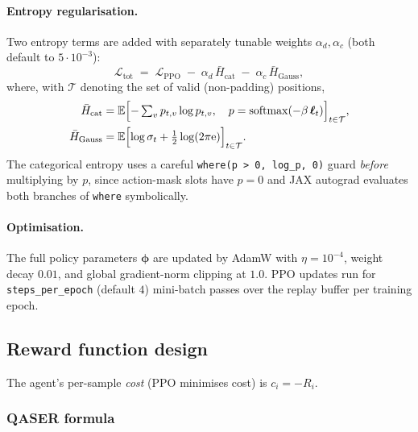 \documentclass[11pt,a4paper]{article}
\newcommand{\Expect}{\mathbb{E}}
\newcommand{\softmax}{\operatorname{softmax}}
\newcommand{\E}{\mathrm{e}}
\begin{document}
\paragraph{Entropy regularisation.}
Two entropy terms are added with separately tunable weights $\alpha_d, \alpha_c$ (both default to $5\!\cdot\!10^{-3}$):
\begin{equation}
\mathcal{L}_{\text{tot}}
\;=\;
\mathcal{L}_{\text{PPO}}
\;-\;
\alpha_d\,\bar{H}_{\text{cat}}
\;-\;
\alpha_c\,\bar{H}_{\text{Gauss}},
\end{equation}
where, with $\mathcal{T}$ denoting the set of valid (non-padding) positions,
\begin{align}
\bar{H}_{\text{cat}}
&= \Expect\Bigl[
-\textstyle\sum_{v} p_{t,v}\log p_{t,v},\quad
p = \softmax(-\beta\,\bm{\ell}_t)
\Bigr]_{t \in \mathcal{T}},\\
\bar{H}_{\text{Gauss}}
&= \Expect\Bigl[
\log\sigma_t + \tfrac{1}{2}\log(2\pi\E)
\Bigr]_{t \in \mathcal{T}}.
\end{align}
The categorical entropy uses a careful \texttt{where(p > 0, log\_p, 0)} guard \emph{before} multiplying by $p$, since action-mask slots have $p=0$ and JAX autograd evaluates both branches of \texttt{where} symbolically.

\paragraph{Optimisation.}
The full policy parameters $\bm{\phi}$ are updated by AdamW with $\eta = 10^{-4}$, weight decay $0.01$, and global gradient-norm clipping at $1.0$. PPO updates run for \texttt{steps\_per\_epoch} (default $4$) mini-batch passes over the replay buffer per training epoch.

\subsection{Reward function design}
\label{sec:reward}

The agent's per-sample \emph{cost} (PPO minimises cost) is $c_i = -R_i$.

\subsubsection{QASER formula}
\end{document}

